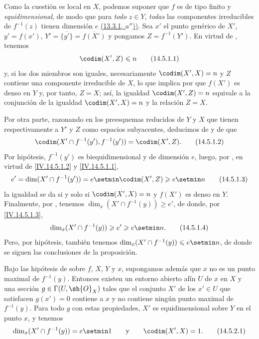 Como la cuestión es local en $X$, podemos suponer que $f$ es de tipo finito y \emph{equidimensional}, de modo que para \emph{todo} $z\in Y$, \emph{todas} las componentes irreducibles de $f^{-1}(z)$ tienen dimensión $e$ {\hyperlink{ega4.c04.prop.13-3-1}{(13.3.1, $a''$))}}.
Sea $x'$ el punto genérico de $X'$, $y'=f(x')$, $Y'=\overline{\{y'\}}=\overline{f(X')}$ y pongamos $Z=f^{-1}(Y')$.
En virtud de , tenemos
\begin{equation}
  \codim(X',Z)\leq n
  \tag{14.5.1.1}\label{IV.14.5.1.1}
\end{equation}
 y, si los dos miembros son iguales, necesariamente $\codim(X',X)=n$ y $Z$ contiene una componente irreducible de $X$, lo que implica por  que $f(X')$ es denso en $Y$ y, por tanto, $Z=X$; así, la igualdad $\codim(X',Z)=n$ equivale a la conjunción de la igualdad $\codim(X',X)=n$ y la relación $Z=X$.

Por otra parte, razonando en los preesquemas reducidos de $Y$ y $X$ que tienen respectivamente a $Y'$ y $Z$ como espacios subyacentes, deducimos de  y de  que
\begin{equation}
  \codim(X'\cap f^{-1}(y'),f^{-1}(y'))=\codim(X',Z).
  \tag{14.5.1.2}\label{IV.14.5.1.2}
\end{equation}
Por hipótesis, $f^{-1}(y')$ es biequidimensional  y de dimensión $e$, luego, por , en virtud de \eqref{IV.14.5.1.2} y \eqref{IV.14.5.1.1},
\begin{equation}
  e'=\dim(X'\cap f^{-1}(y'))=e\setmin\codim(X',Z)\geq e\setmin n
  \tag{14.5.1.3}\label{IV.14.5.1.3}
\end{equation}
la igualdad se da si y solo si $\codim(X',X)=n$ y $f(X')$ es denso en $Y$.
Finalmente, por , tenemos $\dim_x(X'\cap f^{-1}(y))\geq e'$, de donde, por \eqref{IV.14.5.1.3},
\begin{equation}
  \dim_x(X'\cap f^{-1}(y))\geq e'\geq e\setmin n.
  \tag{14.5.1.4}\label{IV.14.5.1.4}
\end{equation}
Pero, por hipótesis, también tenemos $\dim_x(X'\cap f^{-1}(y))\leq e\setmin n$, de donde se siguen las conclusiones de la proposición.

\begin{corollary}[14.5.2]
\label{IV.14.5.2}
Bajo las hipótesis de  sobre $f$, $X$, $Y$ y $x$, supongamos además que $x$ no es un punto maximal de $f^{-1}(y)$.
Entonces existen un entorno abierto afín $U$ de $x$ en $X$ y una sección $g\in\Gamma(U,\sh{O}_X)$ tales que el conjunto $X'$ de los $x'\in U$ que satisfacen $g(x')=0$ contiene a $x$ y no contiene ningún punto maximal de $f^{-1}(y)$.
Para todo $g$ con estas propiedades, $X'$ es equidimensional sobre $Y$ en el punto $x$, y tenemos
\begin{equation}
  \dim_x(X'\cap f^{-1}(y))=e\setmin 1 \qquad\text{y}\qquad \codim(X',X)=1.
  \tag{14.5.2.1}\label{IV.14.5.2.1}
\end{equation}
\end{corollary}

